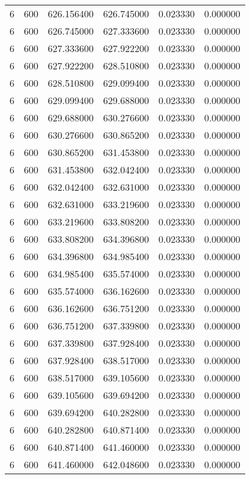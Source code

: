 \begin{longtable}{rrrrrr}
6 & 600 & 626.156400 & 626.745000 & 0.023330 & 0.000000 \\
6 & 600 & 626.745000 & 627.333600 & 0.023330 & 0.000000 \\
6 & 600 & 627.333600 & 627.922200 & 0.023330 & 0.000000 \\
6 & 600 & 627.922200 & 628.510800 & 0.023330 & 0.000000 \\
6 & 600 & 628.510800 & 629.099400 & 0.023330 & 0.000000 \\
6 & 600 & 629.099400 & 629.688000 & 0.023330 & 0.000000 \\
6 & 600 & 629.688000 & 630.276600 & 0.023330 & 0.000000 \\
6 & 600 & 630.276600 & 630.865200 & 0.023330 & 0.000000 \\
6 & 600 & 630.865200 & 631.453800 & 0.023330 & 0.000000 \\
6 & 600 & 631.453800 & 632.042400 & 0.023330 & 0.000000 \\
6 & 600 & 632.042400 & 632.631000 & 0.023330 & 0.000000 \\
6 & 600 & 632.631000 & 633.219600 & 0.023330 & 0.000000 \\
6 & 600 & 633.219600 & 633.808200 & 0.023330 & 0.000000 \\
6 & 600 & 633.808200 & 634.396800 & 0.023330 & 0.000000 \\
6 & 600 & 634.396800 & 634.985400 & 0.023330 & 0.000000 \\
6 & 600 & 634.985400 & 635.574000 & 0.023330 & 0.000000 \\
6 & 600 & 635.574000 & 636.162600 & 0.023330 & 0.000000 \\
6 & 600 & 636.162600 & 636.751200 & 0.023330 & 0.000000 \\
6 & 600 & 636.751200 & 637.339800 & 0.023330 & 0.000000 \\
6 & 600 & 637.339800 & 637.928400 & 0.023330 & 0.000000 \\
6 & 600 & 637.928400 & 638.517000 & 0.023330 & 0.000000 \\
6 & 600 & 638.517000 & 639.105600 & 0.023330 & 0.000000 \\
6 & 600 & 639.105600 & 639.694200 & 0.023330 & 0.000000 \\
6 & 600 & 639.694200 & 640.282800 & 0.023330 & 0.000000 \\
6 & 600 & 640.282800 & 640.871400 & 0.023330 & 0.000000 \\
6 & 600 & 640.871400 & 641.460000 & 0.023330 & 0.000000 \\
6 & 600 & 641.460000 & 642.048600 & 0.023330 & 0.000000 \\

\end{longtable}
